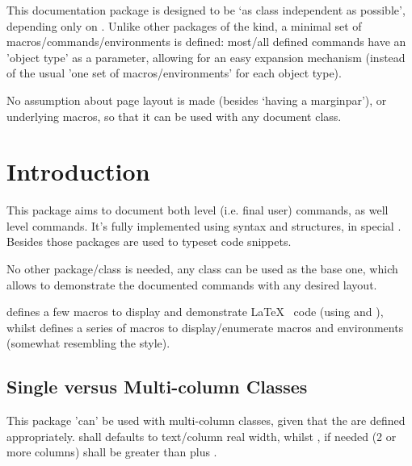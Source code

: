 \documentclass{article}
\begin{document}

  
\begin{typesetabstract}

This documentation package is designed to be `as class independent as possible', depending only on . Unlike other packages of the kind, a minimal set of macros/commands/environments is defined: most/all defined commands have an 'object type' as a  parameter, allowing for an easy expansion mechanism (instead of the usual 'one set of macros/environments' for each object type).

No assumption about page layout is made (besides `having a marginpar'),  or underlying macros, so that it can be used with any document class.

\end{typesetabstract}

\tableofcontents


\section{Introduction}

This package aims to document both  level (i.e. final user) commands, as well  level commands. It's fully implemented using  syntax and structures, in special . Besides those  packages are used to typeset code snippets.
 
 
No other package/class is needed, any class can be used as the base one, which allows to demonstrate the documented commands with any desired layout.

 defines a few macros to display and demonstrate \LaTeX~ code (using  and ), whilst  defines a series of macros to display/enumerate macros and environments (somewhat resembling the  style).

\subsection{Single versus Multi-column Classes}
This package 'can' be used with multi-column classes, given that the \tsobj[code]{\linewidth,\columnsep} are defined appropriately. \tsobj{\linewidth} shall defaults to text/column real width, whilst \tsobj{\columnsep}, if needed (2 or more columns) shall be greater than \tsobj{\marginparwidth} plus \tsobj{\marginparsep}.
\end{document}
